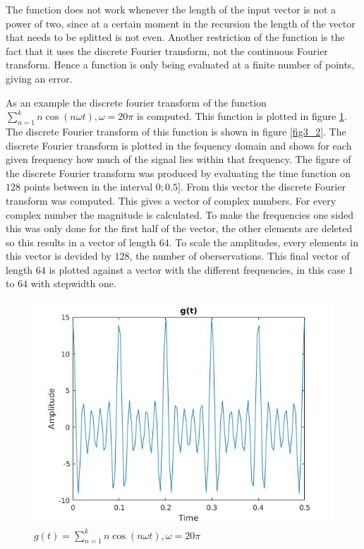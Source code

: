 \documentclass[12pt]{article}
\begin{document}
%
The function does not work whenever the length of the input vector is not a power of two, since at a certain moment in the recursion the length of the vector that needs to be splitted is not even. Another restriction of the function is the fact that it uses the discrete Fourier transform, not the continuous Fourier transform. Hence a function is only being evaluated at a finite number of points, giving an error. %

As an example the discrete fourier transform of the function $\sum_{n=1}^{k} n \cos(n\omega t), \omega = 20 \pi$ is computed. This function is plotted in figure \ref{fig3_1}. The discrete Fourier transform of this function is shown in figure \ref{fig3_2}. The discrete Fourier transform is plotted in the fequency domain and shows for each given frequency how much of the signal lies within that frequency. 
The figure of the discrete Fourier transform was produced by evaluating the time function on $128$ points between in the interval $0;0.5]$. From this vector the discrete Fourier transform was computed. This gives a vector of complex numbers. For every complex number the magnitude is calculated. To make the frequencies one sided this was only done for the first half of the vector, the other elements are deleted so this results in a vector of length $64$. To scale the amplitudes, every elements in this vector is devided by $128$, the number of oberservations. This final vector of length $64$ is plotted against a vector with the different frequencies, in this case $1$ to $64$ with stepwidth one.
\begin{figure}[H]
\centering
\includegraphics[width=0.6\linewidth,natwidth=610,natheight=642]{ex3_func_wiki_1_func.jpg}
\caption{$g(t)= \sum_{n=1}^{k} n \cos(n\omega t), \omega = 20 \pi$}
\label{fig3_1}
\end{figure}
\end{document}
